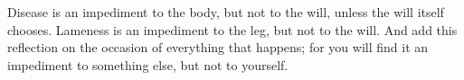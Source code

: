 Disease is  an impediment to  the body,  but not to  the will, unless  the will
itself chooses. Lameness is an impediment to  the leg, but not to the will. And
add this  reflection on the occasion  of everything that happens;  for you will
find it an impediment to something else, but not to yourself.
